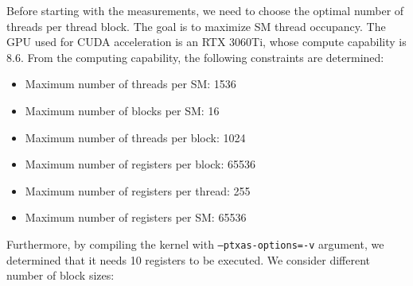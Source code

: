 Before starting with the measurements, we need to choose the optimal number of threads per thread block. The goal is to maximize SM thread occupancy.
The GPU used for CUDA acceleration is an RTX 3060Ti, whose compute capability is 8.6. From the computing capability, the following constraints are determined:
\begin{itemize}
  \item Maximum number of threads per SM: 1536
  \item Maximum number of blocks per SM: 16
  \item Maximum number of threads per block: 1024
  \item Maximum number of registers per block: 65536
  \item Maximum number of registers per thread: 255
  \item Maximum number of registers per SM: 65536
\end{itemize}
Furthermore, by compiling the kernel with \texttt{--ptxas-options=-v} argument, we determined that it needs 10 registers to be executed. We consider different number of block sizes:
